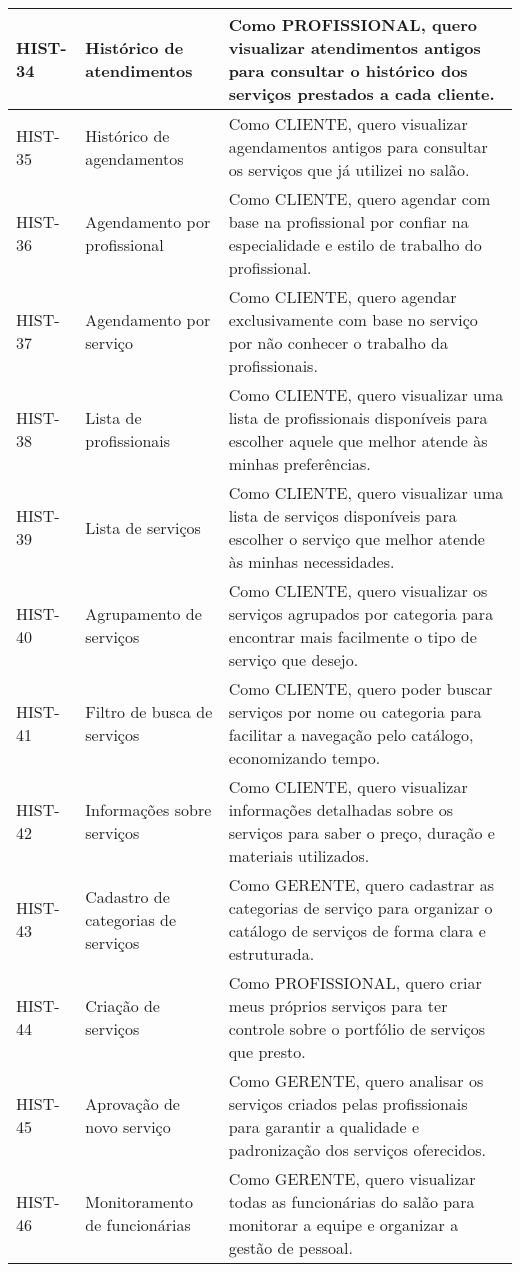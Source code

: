 \begin{longtable}{|p{2cm}|p{4cm}|p{9cm}|}
	HIST-34 & Histórico de atendimentos & Como PROFISSIONAL, quero visualizar atendimentos antigos para consultar o histórico dos serviços prestados a cada cliente. \\ \hline
	HIST-35 & Histórico de agendamentos & Como CLIENTE, quero visualizar agendamentos antigos para consultar os serviços que já utilizei no salão. \\ \hline
	HIST-36 & Agendamento por profissional & Como CLIENTE, quero agendar com base na profissional por confiar na especialidade e estilo de trabalho do profissional. \\ \hline
	HIST-37 & Agendamento por serviço & Como CLIENTE, quero agendar exclusivamente com base no serviço por não conhecer o trabalho da profissionais. \\ \hline
	HIST-38 & Lista de profissionais & Como CLIENTE, quero visualizar uma lista de profissionais disponíveis para escolher aquele que melhor atende às minhas preferências. \\ \hline
	HIST-39 & Lista de serviços & Como CLIENTE, quero visualizar uma lista de serviços disponíveis para escolher o serviço que melhor atende às minhas necessidades. \\ \hline
	HIST-40 & Agrupamento de serviços & Como CLIENTE, quero visualizar os serviços agrupados por categoria para encontrar mais facilmente o tipo de serviço que desejo. \\ \hline
	HIST-41 & Filtro de busca de serviços & Como CLIENTE, quero poder buscar serviços por nome ou categoria para facilitar a navegação pelo catálogo, economizando tempo. \\ \hline
	HIST-42 & Informações sobre serviços & Como CLIENTE, quero visualizar informações detalhadas sobre os serviços para saber o preço, duração e materiais utilizados. \\ \hline
	HIST-43 & Cadastro de categorias de serviços & Como GERENTE, quero cadastrar as categorias de serviço para organizar o catálogo de serviços de forma clara e estruturada. \\ \hline
	HIST-44 & Criação de serviços & Como PROFISSIONAL, quero criar meus próprios serviços para ter controle sobre o portfólio de serviços que presto. \\ \hline
	HIST-45 & Aprovação de novo serviço & Como GERENTE, quero analisar os serviços criados pelas profissionais para garantir a qualidade e padronização dos serviços oferecidos. \\ \hline
	HIST-46 & Monitoramento de funcionárias & Como GERENTE, quero visualizar todas as funcionárias do salão para monitorar a equipe e organizar a gestão de pessoal. \\ \hline

\end{longtable}
